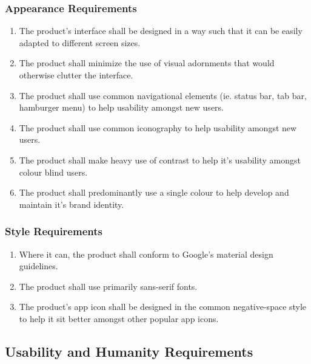 \documentclass[]{article}
\begin{document}
\subsubsection{Appearance Requirements}
\label{ssub:appearance_requirements}
\begin{enumerate}[{LF}1. ]
	\item The product's interface shall be designed in a way such that it can be easily adapted to different screen sizes.
	\item The product shall minimize the use of visual adornments that would otherwise clutter the interface.
	\item The product shall use common navigational elements (ie. status bar, tab bar, hamburger menu) to help usability amongst new users.
	\item The product shall use common iconography to help usability amongst new users. 
	\item The product shall make heavy use of contrast to help it's usability amongst colour blind users.
	\item The product shall predominantly use a single colour to help develop and maintain it's brand identity.
	\holdEnum
\end{enumerate}

\subsubsection{Style Requirements}
\label{ssub:style_requirements}
\begin{enumerate}[{LF}1.]
	\resumeEnum
	\item Where it can, the product shall conform to Google's material design guidelines.
	\item The product shall use primarily sans-serif fonts.
	\item The product's app icon shall be designed in the common negative-space style to help it sit better amongst other popular app icons.  
\end{enumerate}


\subsection{Usability and Humanity Requirements}
\label{sub:usability_and_humanity_requirements}
\end{document}
